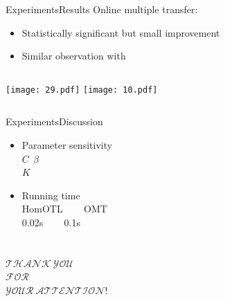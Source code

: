 \documentclass{beamer}
\begin{document}
\begin{frame}{Experiments}{Results}
Online multiple transfer:
\begin{itemize}
\item
Statistically significant but small improvement
\item
Similar observation with \cite{zhao2014online}
\end{itemize}
\begin{columns}
\texttt{[image: 29.pdf]}
\texttt{[image: 10.pdf]}
\end{columns}
\end{frame}

\begin{frame}{Experiments}{Discussion}
\begin{itemize}
\item
Parameter sensitivity
\\
$C ~~ \beta$
\\
$ K $
\item
Running time
\\
HomOTL ~~~ OMT
\\
0.02s ~~~ 0.1s
\end{itemize}
\end{frame}

\begin{frame}[allowframebreaks]{}
\scriptsize


\end{frame}

\section{}
\begin{frame}{}{}
\begin{center}
\begin{Huge}
$ \mathcal{THANK \ YOU}$ \\
$ \mathcal{FOR} $ \\
$ \mathcal{YOUR \ ATTENTION!}$ \\
\end{Huge}
\end{center}
\end{frame}
\end{document}
